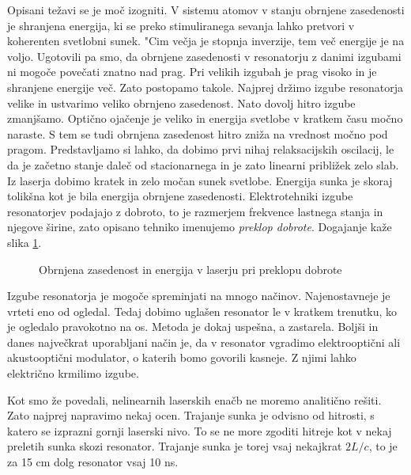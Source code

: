 Opisani težavi se je moč izogniti. V sistemu atomov v stanju obrnjene
zasedenosti je shranjena energija, ki se preko stimuliranega sevanja lahko
pretvori v koherenten svetlobni sunek. "Cim večja je stopnja inverzije, tem
več energije je na voljo. Ugotovili pa smo, da obrnjene zasedenosti v
resonatorju z danimi izgubami ni mogoče povečati znatno nad prag. Pri
velikih izgubah je prag visoko in je shranjene energije več. Zato postopamo
takole. Najprej držimo izgube resonatorja velike in ustvarimo veliko
obrnjeno zasedenost. Nato dovolj hitro izgube zmanjšamo. Optično ojačenje
je veliko in energija svetlobe v kratkem času močno naraste. S tem se tudi
obrnjena zasedenost hitro zniža na vrednost močno pod pragom.
Predstavljamo si lahko, da dobimo prvi nihaj relaksacijskih oscilacij, le da
je začetno stanje daleč od stacionarnega in je zato linearni približek
zelo slab. Iz laserja dobimo kratek in zelo močan sunek svetlobe. Energija
sunka je skoraj tolikšna kot je bila energija obrnjene zasedenosti.
Elektrotehniki izgube resonatorjev podajajo z dobroto, to je razmerjem
frekvence lastnega stanja in njegove širine, zato opisano tehniko imenujemo 
{\it preklop dobrote}. Dogajanje kaže slika \ref{s5.9}.

\begin{figure}[tbp]
\label{s5.9} \vskip 10cm
\caption{Obrnjena zasedenost in energija v laserju pri preklopu dobrote}
\end{figure}

Izgube resonatorja je mogoče spreminjati na mnogo načinov. Najenostavneje
je vrteti eno od ogledal. Tedaj dobimo uglašen resonator le v kratkem
trenutku, ko je ogledalo pravokotno na os. Metoda je dokaj uspešna, a
zastarela. Boljši in danes največkrat uporabljani način je, da v
resonator vgradimo elektrooptični ali akustooptični modulator, o katerih
bomo govorili kasneje. Z njimi lahko električno krmilimo izgube.

Kot smo že povedali, nelinearnih laserskih enačb ne moremo analitično
rešiti. Zato najprej napravimo nekaj ocen. Trajanje sunka je odvisno od
hitrosti, s katero se izprazni gornji laserski nivo. To se ne more zgoditi
hitreje kot v nekaj preletih sunka skozi resonator. Trajanje sunka je torej
vsaj nekajkrat $2L/c$, to je za 15 cm dolg resonator vsaj 10 ns.

